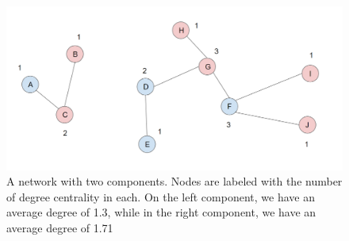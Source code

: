     \begin{figure}[h]
        \centering
            \includegraphics[width=0.7\linewidth]{figures/Networks/Concepts/edgesConnectivity.png} 
        \caption{A network with two components. Nodes are labeled with the number of degree centrality in each. On the left component, we have an average degree of 1.3, while in the right component, we have an average degree of 1.71}
        \label{figure:networksConnectivity}
    \end{figure}   

